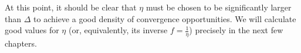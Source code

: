At this point, it should be clear that $\eta$ must be chosen to be significantly
larger than $\Delta$ to achieve a good density of convergence opportunities.
We will calculate good values for $\eta$ (or, equivalently, its inverse $f = \frac{1}{\eta}$)
precisely in the next few chapters.

%
%
%
%

